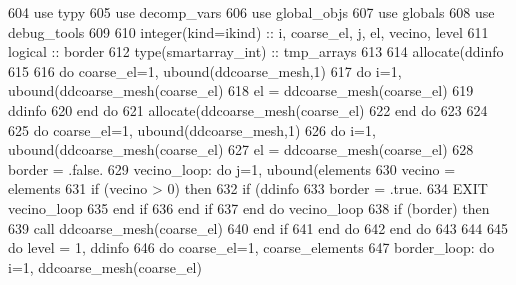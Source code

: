 \begin{DoxyCode}
604       \textcolor{keywordtype}{use }typy
605       \textcolor{keywordtype}{use }decomp_vars
606       \textcolor{keywordtype}{use }global_objs
607       \textcolor{keywordtype}{use }globals
608       \textcolor{keywordtype}{use }debug_tools
609       
610       \textcolor{keywordtype}{integer(kind=ikind)} :: i, coarse\_el, j, el, vecino, level
611       \textcolor{keywordtype}{logical} :: border
612       \textcolor{keywordtype}{type}(smartarray_int) :: tmp\_arrays
613       
614       \textcolor{keyword}{allocate}(ddinfo%
615         
616       \textcolor{keywordflow}{do} coarse\_el=1, ubound(ddcoarse_mesh,1)
617         \textcolor{keywordflow}{do} i=1, ubound(ddcoarse_mesh(coarse\_el)%
618           el = ddcoarse_mesh(coarse\_el)%
619           ddinfo%
620 \textcolor{keywordflow}{        end do}
621         \textcolor{keyword}{allocate}(ddcoarse_mesh(coarse\_el)%
622 \textcolor{keywordflow}{      end do}
623         
624 
625       \textcolor{keywordflow}{do} coarse\_el=1, ubound(ddcoarse_mesh,1)
626         \textcolor{keywordflow}{do} i=1, ubound(ddcoarse_mesh(coarse\_el)%
627           el = ddcoarse_mesh(coarse\_el)%
628           border = .false.
629           vecino\_loop: \textcolor{keywordflow}{do} j=1, ubound(elements%
630                         vecino = elements%
631                         \textcolor{keywordflow}{if} (vecino > 0) \textcolor{keywordflow}{then}
632                           \textcolor{keywordflow}{if} (ddinfo%
633                             border = .true.
634                             \textcolor{keywordflow}{EXIT} vecino\_loop
635 \textcolor{keywordflow}{                          end if}
636 \textcolor{keywordflow}{                        end if}
637 \textcolor{keywordflow}{          end do} vecino\_loop
638           \textcolor{keywordflow}{if} (border) \textcolor{keywordflow}{then}
639             \textcolor{keyword}{call }ddcoarse_mesh(coarse\_el)%
640 \textcolor{keywordflow}{          end if}
641 \textcolor{keywordflow}{        end do}
642 \textcolor{keywordflow}{      end do}
643       
644       
645       \textcolor{keywordflow}{do} level = 1, ddinfo%
646         \textcolor{keywordflow}{do} coarse\_el=1, coarse_elements%
647           border\_loop: \textcolor{keywordflow}{do} i=1, ddcoarse_mesh(coarse\_el)%

\end{DoxyCode}
